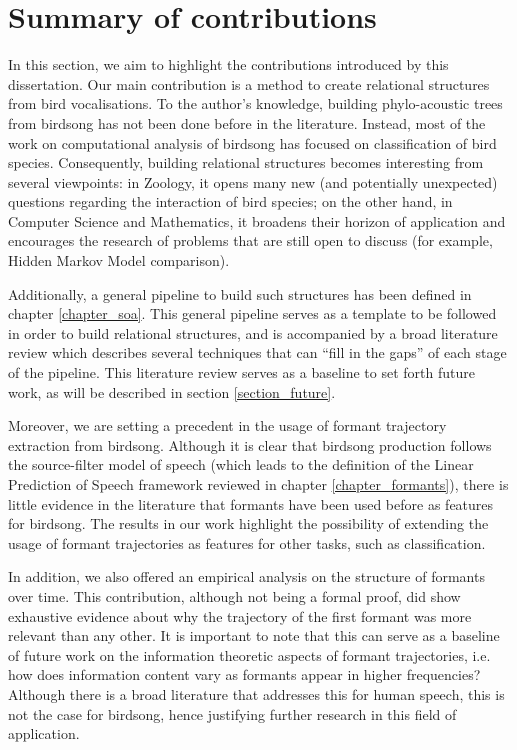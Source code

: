 \documentclass[../main.tex]{subfiles}
\begin{document}
\section{Summary of contributions}
In this section, we aim to highlight the contributions introduced by this dissertation. Our main contribution is a method to create relational structures from bird vocalisations. To the author's knowledge, building phylo-acoustic trees from birdsong has not been done before in the literature. Instead, most of the work on computational analysis of birdsong has focused on classification of bird species. Consequently, building relational structures becomes interesting from several viewpoints: in Zoology, it opens many new (and potentially unexpected) questions regarding the interaction of bird species; on the other hand, in Computer Science and Mathematics, it broadens their horizon of application and encourages the research of problems that are still open to discuss (for example, Hidden Markov Model comparison).
\par Additionally, a general pipeline to build such structures has been defined in chapter \ref{chapter_soa}. This general pipeline serves as a template to be followed in order to build relational structures, and is accompanied by a broad literature review which describes several techniques that can ``fill in the gaps'' of each stage of the pipeline. This literature review serves as a baseline to set forth future work, as will be described in section \ref{section_future}.
\par Moreover, we are setting a precedent in the usage of formant trajectory extraction from birdsong. Although it is clear that birdsong production follows the source-filter model of speech (which leads to the definition of the Linear Prediction of Speech framework reviewed in chapter \ref{chapter_formants}), there is little evidence in the literature that formants have been used before as features for birdsong. The results in our work highlight the possibility of extending the usage of formant trajectories as features for other tasks, such as classification. 
\par In addition, we also offered an empirical analysis on the structure of formants over time. This contribution, although not being a formal proof, did show exhaustive evidence about why the trajectory of the first formant was more relevant than any other. It is important to note that this can serve as a baseline of future work on the information theoretic aspects of formant trajectories, i.e. how does information content vary as formants appear in higher frequencies? Although there is a broad literature that addresses this for human speech, this is not the case for birdsong, hence justifying further research in this field of application.
\end{document}

